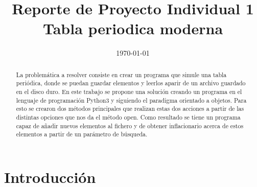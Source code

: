 \documentclass[conference]{IEEEtran}
\date{\specialdate\today}
\begin{document}
%
%
%

\newcommand{\breite}{0.9} %
\newcommand{\RelacionFiguradoscolumnas}{0.9}
\newcommand{\RelacionFiguradoscolumnasPuntoCinco}{0.45}




\title{Reporte de Proyecto Individual 1 \\ Tabla periodica moderna}

\author{
}



\maketitle

\begin{abstract} 
La problemática a resolver consiste en crear un programa que simule una tabla periódica, donde se puedan guardar elementos y leerlos aparir de un archivo guardado en el disco duro. En este trabajo se propone una solución creando un programa en el lenguaje de programación Python3 y siguiendo el paradigma orientado a objetos. Para esto se crearon dos métodos principales que realizan estas dos acciones a partir de las distintas opciones que nos da el método open. Como resultado se tiene un programa capaz de añadir nuevos elementos al fichero y de obtener inflacionario acerca de estos elementos a partir de un parámetro de búsqueda.

\end{abstract}






\section{Introducción}
\end{document}
